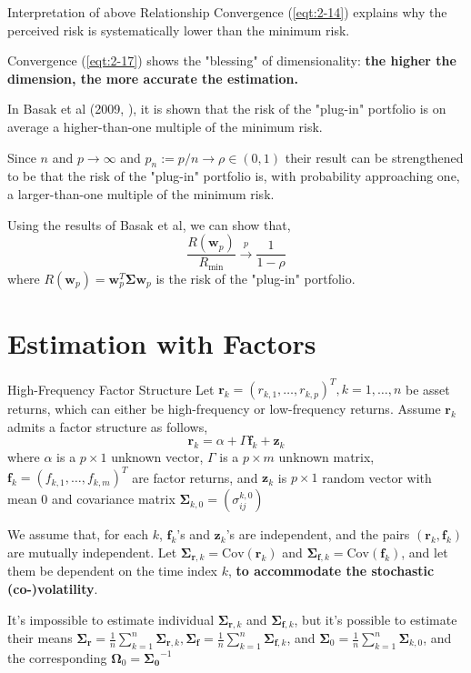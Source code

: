 \documentclass{beamer}
\begin{document}
\begin{frame}{Interpretation of above Relationship}
Convergence (\ref{eqt:2-14}) explains why the perceived risk is systematically lower than the minimum risk.

Convergence (\ref{eqt:2-17}) shows the "blessing" of dimensionality: \textbf{the higher the dimension, the more accurate the estimation.}\newline

In Basak et al (2009, \cite{basak2009jackknife}), it is shown that the risk of the "plug-in" portfolio is on average a higher-than-one multiple of the minimum risk. 

Since $n$ and $p \to \infty$ and $p_n := p/n\to \rho \in (0,1) $ their result can be strengthened to be that the risk of the "plug-in" portfolio is, with probability approaching one, a larger-than-one multiple of the minimum risk.

Using the results of Basak et al, we can show that,
\begin{equation}
\label{eqt:2-18}
\frac{R\left(\boldsymbol{w}_p\right)}{R_{\min }} \stackrel{p}{\longrightarrow} \frac{1}{1-\rho}
\end{equation}
where $R(\bm{w}_p) = \bm{w}_p^T\bm{\Sigma}\bm{w}_p$ is the risk of the "plug-in" portfolio.
\end{frame} 

\section{Estimation with Factors}
\begin{frame}{High-Frequency Factor Structure}
Let $\bm{r}_k = (r_{k,1},\dots, r_{k,p})^T, k = 1,\dots, n$ be asset returns, which can either be high-frequency or low-frequency returns. Assume $\bm{r}_k$ admits a factor structure as follows,
\begin{equation}
\label{eqt:3-1}
\mathbf{r}_k=\alpha+\Gamma \mathbf{f}_k+\mathbf{z}_k
\end{equation}
where $\alpha$ is a $p\times 1$ unknown vector, $\Gamma$ is a $p\times m$ unknown matrix, $\bm{f}_k = (f_{k,1},\dots, f_{k,m})^T$ are factor returns, and $\bm{z}_k$ is $p\times 1$ random vector with mean 0 and covariance matrix $\bm{\Sigma}_{k,0} = (\sigma_{ij}^{k,0})$\newline

We assume that, for each $k$, $\bm{f}_k$'s and $\bm{z}_k$'s are independent, and the pairs $(\bm{r}_k, \bm{f}_k)$ are mutually independent. Let $\bm{\Sigma}_{\bm{r}, k} = \text{Cov}(\bm{r}_k) $ and $\bm{\Sigma}_{\bm{f}, k} = \text{Cov}(\bm{f}_k) $, and let them be dependent on the time index $k$, \textbf{to accommodate the stochastic (co-)volatility}. 

It's impossible to estimate individual $\bm{\Sigma}_{\bm{r}, k}$ and $\bm{\Sigma}_{\bm{f}, k}$, but it's possible to estimate their means $\boldsymbol{\Sigma}_{\mathbf{r}}=\frac{1}{n} \sum_{k=1}^n \boldsymbol{\Sigma}_{\mathbf{r}, k}, \boldsymbol{\Sigma}_{\mathbf{f}}=\frac{1}{n} \sum_{k=1}^n \boldsymbol{\Sigma}_{\mathbf{f}, k}$, and $\boldsymbol{\Sigma}_0=\frac{1}{n} \sum_{k=1}^n \boldsymbol{\Sigma}_{k, 0}$, and the corresponding $\bm{\Omega}_0 = \bm{\Sigma_0}^{-1}$
\end{frame}
\end{document}
